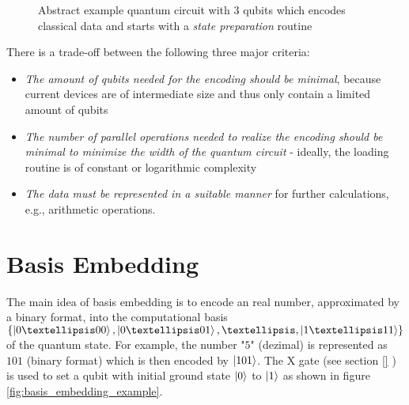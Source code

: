 \begin{figure}[!h]
    \centering
    \caption{Abstract example quantum circuit with 3 qubits which encodes classical data and starts with a \textit{state preparation} routine}
    \label{fig:circuit_state_preparation}
\end{figure}

There is a trade-off between the following three major criteria\cite{Weigold2021_ExpandingDataEncodingPatterns}:
\begin{itemize}
    \item \textit{The amount of qubits needed for the encoding should be minimal}, because current devices are of intermediate size and thus only contain a limited amount of qubits
    \item \textit{The number of parallel operations needed to realize the encoding should be minimal to minimize the width of the quantum circuit} - ideally, the loading routine is of constant or logarithmic complexity
    \item \textit{The data must be represented in a suitable manner} for further calculations, e.g., arithmetic operations.
\end{itemize}

\section{Basis Embedding}\label{section:basis_embedding}
The main idea of basis embedding is to encode an real number, approximated by a binary format, into the computational basis $\{\ket{0…00}, \ket{0…01}, …, \ket{1…11}\}$ of the quantum state. For example, the number "$5$" (dezimal) is represented as $101$ (binary format) which is then encoded by $\ket{101}$\cite{Weigold2021_EncodingPatternsForQuantumAlgorithms,schuld2021supervised}. The $\mathrm{X}$ gate (see section \ref{} ) is used to set a qubit with initial ground state $\ket{0}$ to $\ket{1}$ as shown in figure \ref{fig:basis_embedding_example}.

